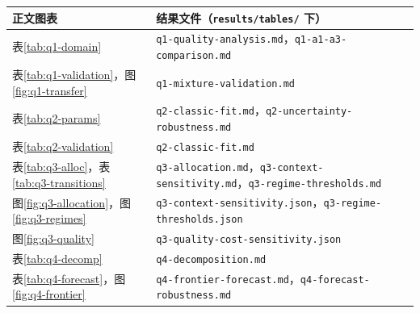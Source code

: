 \begin{center}
  \begin{minipage}{\textwidth}
  \centering
  \label{tab:artifacts}
  \begin{tabular}{>{\raggedright\arraybackslash}p{3.2cm}>{\raggedright\arraybackslash}p{12.2cm}}
    \toprule
    正文图表 & 结果文件（\texttt{results/tables/} 下） \\
    \midrule
    表\ref{tab:q1-domain} & \texttt{q1-quality-analysis.md}，\texttt{q1-a1-a3-comparison.md} \\
    表\ref{tab:q1-validation}，图\ref{fig:q1-transfer} & \texttt{q1-mixture-validation.md} \\
    表\ref{tab:q2-params} & \texttt{q2-classic-fit.md}，\texttt{q2-uncertainty-robustness.md} \\
    表\ref{tab:q2-validation} & \texttt{q2-classic-fit.md} \\
    表\ref{tab:q3-alloc}，表\ref{tab:q3-transitions} & \texttt{q3-allocation.md}，\texttt{q3-context-sensitivity.md}，\texttt{q3-regime-thresholds.md} \\
    图\ref{fig:q3-allocation}，图\ref{fig:q3-regimes} & \texttt{q3-context-sensitivity.json}，\texttt{q3-regime-thresholds.json} \\
    图\ref{fig:q3-quality} & \texttt{q3-quality-cost-sensitivity.json} \\
    表\ref{tab:q4-decomp} & \texttt{q4-decomposition.md} \\
    表\ref{tab:q4-forecast}，图\ref{fig:q4-frontier} & \texttt{q4-frontier-forecast.md}，\texttt{q4-forecast-robustness.md} \\
    \bottomrule
  \end{tabular}
  \end{minipage}
\end{center}
